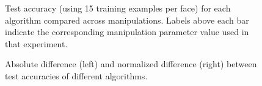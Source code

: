 \documentclass[pageno]{cos429}
\begin{document}
\begin{figure}[ht]
    \qquad
    \caption{Test accuracy (using 15 training examples per face) for each algorithm compared across manipulations. Labels above each bar indicate the corresponding manipulation parameter value used in that experiment.}
    \label{fig:results_algorithms}
\end{figure}

\begin{figure}[ht]
\centering
{}
\caption{Absolute difference (left) and normalized difference (right) between test accuracies of different algorithms.}
\label{fig:results_diff}
\end{figure}
\end{document}
